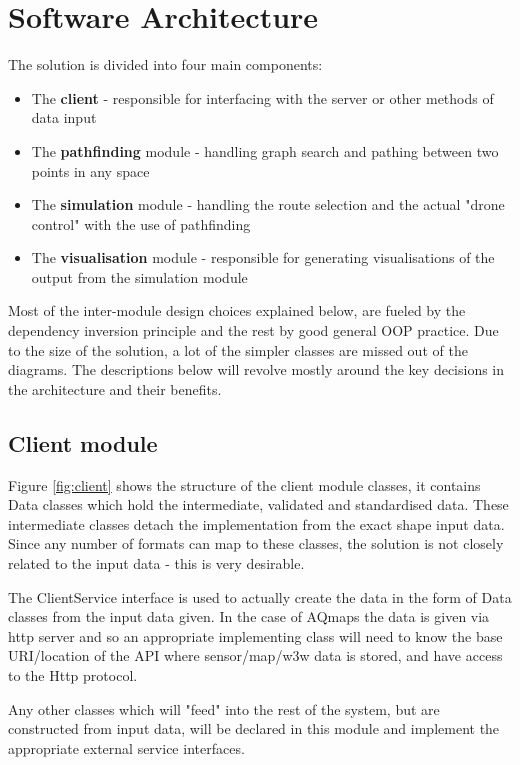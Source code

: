 \documentclass[10pt,a4paper]{article}
\begin{document}
{}


\section{Software Architecture}
The solution is divided into four main components: 
\begin{itemize}
    \item The \textbf{client} - responsible for interfacing with the server or other methods of data input
    \item The \textbf{pathfinding} module - handling graph search and pathing between two points in any space
    \item The \textbf{simulation} module - handling the route selection and the actual "drone control" with the use of pathfinding
    \item The \textbf{visualisation} module - responsible for generating visualisations of the output from the simulation module
\end{itemize}

Most of the inter-module design choices explained below, are fueled by the dependency inversion principle and the rest by good general OOP practice. 
Due to the size of the solution, a lot of the simpler classes are missed out of the diagrams. 
The descriptions below will revolve mostly around the key decisions in the architecture and their benefits.

\subsection{Client module}
Figure \ref{fig:client} shows the structure of the client module classes, it contains Data classes which hold the intermediate, validated and standardised data.
These intermediate classes detach the implementation from the exact shape input data. 
Since any number of formats can map to these classes, the solution is not closely related to the input data - this is very desirable. \par

The ClientService interface is used to actually create the data in the form of Data classes from the input data given. 
In the case of AQmaps the data is given via http server and so an appropriate implementing class will need to know the base URI/location of the API where sensor/map/w3w data is stored, and have access to the Http protocol.

\par 
Any other classes which will "feed" into the rest of the system, but are constructed from input data, will be declared in this module and implement the appropriate external service interfaces.
\end{document}
